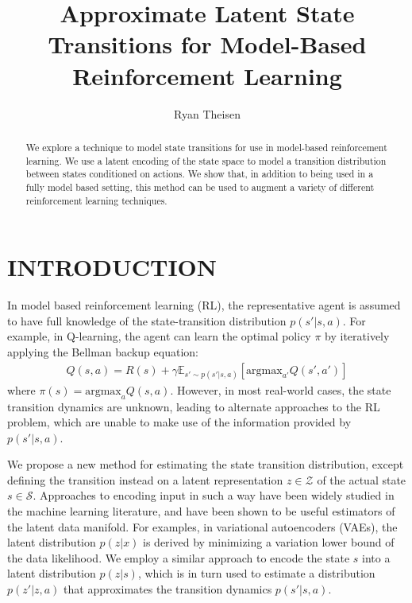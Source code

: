 \documentclass[letterpaper, 10 pt, conference]{ieeeconf}  %
\title{\LARGE \bf
Approximate Latent State Transitions for Model-Based Reinforcement Learning
}
\author{Ryan Theisen}%
\begin{document}
\maketitle
\thispagestyle{empty}
\pagestyle{empty}


\begin{abstract}

We explore a technique to model state transitions for use in model-based reinforcement learning. We use a latent encoding of the state space to model a transition distribution between states conditioned on actions. We show that, in addition to being used in a fully model based setting, this method can be used to augment a variety of different reinforcement learning techniques.

\end{abstract}


\section{INTRODUCTION}

In model based reinforcement learning (RL), the representative agent is assumed to have full knowledge of the state-transition distribution $p(s'|s,a)$. For example, in Q-learning, the agent can learn the optimal policy $\pi$ by iteratively applying the Bellman backup equation:
\begin{align*}
	Q(s,a) = R(s) + \gamma\mathbb{E}_{s'\sim p(s'|s,a)}[\text{argmax}_{a'}Q(s',a')]
\end{align*}
where $\pi(s) = \text{argmax}_{a}Q(s,a)$. However, in most real-world cases, the state transition dynamics are unknown, leading to alternate approaches to the RL problem, which are unable to make use of the information provided by $p(s'|s,a)$.

We propose a new method for estimating the state transition distribution, except defining the transition instead on a latent representation $z\in\mathcal{Z}$ of the actual state $s\in\mathcal{S}$. Approaches to encoding input in such a way have been widely studied in the machine learning literature, and have been shown to be useful estimators of the latent data manifold. For examples, in variational autoencoders (VAEs), the latent distribution $p(z|x)$ is derived by minimizing a variation lower bound of the data likelihood. We employ a similar approach to encode the state $s$ into a latent distribution $p(z|s)$, which is in turn used to estimate a distribution $p(z'|z,a)$ that approximates the transition dynamics $p(s'|s,a)$.
\end{document}
